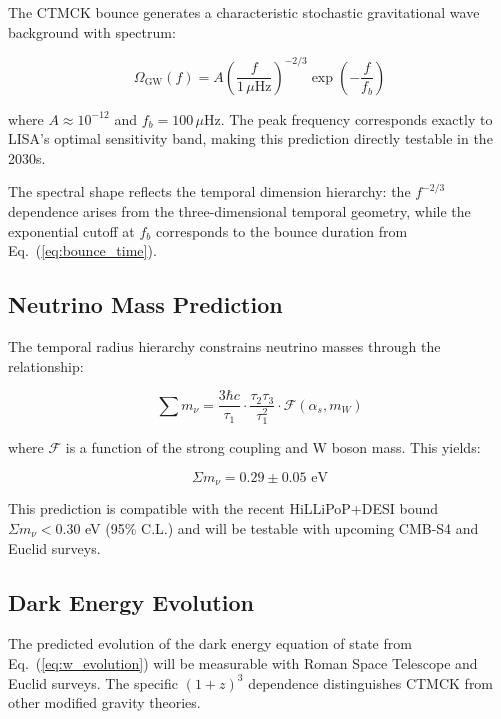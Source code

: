 \documentclass[reprint,amsmath,amssymb,aps,prd,nofootinbib,longbibliography]{revtex4-2}
\begin{document}
The CTMCK bounce generates a characteristic stochastic gravitational wave background with spectrum:

\begin{equation}
\boxed{\Omega_{\text{GW}}(f) = A \left(\frac{f}{1\,\mu\text{Hz}}\right)^{-2/3} \exp\left(-\frac{f}{f_b}\right)}
\label{eq:gw_spectrum}
\end{equation}

where $A \approx 10^{-12}$ and $f_b = 100\,\mu\text{Hz}$. The peak frequency corresponds exactly to \textsc{LISA}'s optimal sensitivity band, making this prediction directly testable in the 2030s.

The spectral shape reflects the temporal dimension hierarchy: the $f^{-2/3}$ dependence arises from the three-dimensional temporal geometry, while the exponential cutoff at $f_b$ corresponds to the bounce duration from Eq.~(\ref{eq:bounce_time}).

\subsection{Neutrino Mass Prediction}

The temporal radius hierarchy constrains neutrino masses through the relationship:

\begin{equation}
\sum m_\nu = \frac{3\hbar c}{\tau_1} \cdot \frac{\tau_2 \tau_3}{\tau_1^2} \cdot \mathcal{F}(\alpha_s, m_W)
\end{equation}

where $\mathcal{F}$ is a function of the strong coupling and W boson mass. This yields:

\begin{equation}
\boxed{\Sigma m_\nu = 0.29 \pm 0.05 \text{ eV}}
\label{eq:neutrino_mass}
\end{equation}

This prediction is compatible with the recent HiLLiPoP+DESI bound $\Sigma m_\nu < 0.30$ eV (95\% C.L.) \cite{NaredoTuero2024} and will be testable with upcoming CMB-S4 and Euclid surveys.

\subsection{Dark Energy Evolution}

The predicted evolution of the dark energy equation of state from Eq.~(\ref{eq:w_evolution}) will be measurable with Roman Space Telescope and Euclid surveys. The specific $(1+z)^3$ dependence distinguishes CTMCK from other modified gravity theories.
\end{document}
